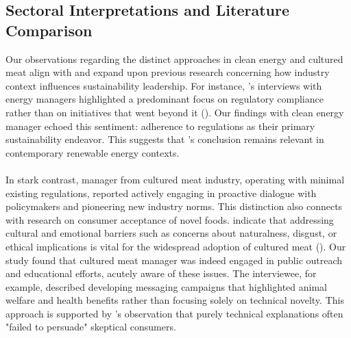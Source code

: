 	\subsection{Sectoral Interpretations and Literature Comparison}
	Our observations regarding the distinct approaches in clean energy and cultured meat align with and expand upon previous research concerning how industry context influences sustainability leadership. For instance, \citeauthor{Fischhoff2024}'s interviews with energy managers highlighted a predominant focus on regulatory compliance rather than on initiatives that went beyond it (\textcite{Fischhoff2024}). Our findings with clean energy manager echoed this sentiment: adherence to regulations as their primary sustainability endeavor. This suggests that \citeauthor{Fischhoff2024}'s conclusion remains relevant in contemporary renewable energy contexts.
	
	\paragraph*{} In stark contrast, manager from cultured meat industry, operating with minimal existing regulations, reported actively engaging in proactive dialogue with policymakers and pioneering new industry norms. This distinction also connects with research on consumer acceptance of novel foods. \citeauthor{Bryant2020} indicate that addressing cultural and emotional barriers such as concerns about naturalness, disgust, or ethical implications is vital for the widespread adoption of cultured meat (\textcite{Bryant2020}). Our study found that cultured meat manager was indeed engaged in public outreach and educational efforts, acutely aware of these issues. The interviewee, for example, described developing messaging campaigns that highlighted animal welfare and health benefits rather than focusing solely on technical novelty. This approach is supported by \citeauthor{Bryant2020}'s observation that purely technical explanations often "failed to persuade" skeptical consumers.
	
